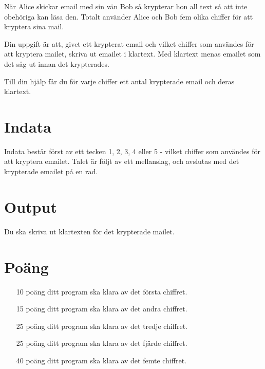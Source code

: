 
När Alice skickar email med sin vän Bob så krypterar hon all text så att inte obehöriga kan läsa den. Totalt använder Alice och Bob fem olika chiffer för att kryptera sina mail.

Din uppgift är att, givet ett krypterat email och vilket chiffer som användes för att kryptera mailet, skriva ut emailet i klartext. Med klartext menas emailet som det såg ut innan det krypterades.

Till din hjälp får du för varje chiffer ett antal krypterade email och deras klartext.

\section*{Indata}
Indata består först av ett tecken 1, 2, 3, 4 eller 5 - vilket chiffer som användes för att kryptera emailet. Talet är följt av ett mellanslag, och avslutas med det krypterade emailet på en rad.

\section*{Output}
Du ska skriva ut klartexten för det krypterade mailet.

\section*{Poäng}

\begin{enumerate}
	\item[10 poäng] ditt program ska klara av det första chiffret.
	\item[15 poäng] ditt program ska klara av det andra chiffret.
	\item[25 poäng] ditt program ska klara av det tredje chiffret.
	\item[25 poäng] ditt program ska klara av det fjärde chiffret.
	\item[40 poäng] ditt program ska klara av det femte chiffret.
\end{enumerate}
